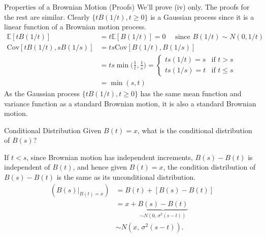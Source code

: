 \documentclass[letterpaper]{beamer}
\def\E{\mathbb E}
\def\CV{\mathrm{Cov}}
\begin{document}
\begin{frame}{Properties of a Brownian Motion (Proofs)}
We'll prove (iv) only. The proofs for the rest are similar.
Clearly $\{tB(1/t), t \ge 0\}$ is a Gaussian process since it is a linear function of a Brownian motion process.
\begin{align*}
\E[tB(1/t)]&=t\E[B(1/t)]=0\quad\text{ since }B(1/t)\sim N(0, 1/t)\\
\CV[tB(1/t),sB(1/s)]&=ts\CV[B(1/t),B(1/s)]\\
&=ts\min\Big(\frac{1}{t},\frac{1}{s}\Big)=\begin{cases}
ts(1/t)=s&\text{if }t>s\\
ts(1/s)=t&\text{if }t\le s
\end{cases}\\
&=\min(s,t)
\end{align*}
As the Gaussian process $\{tB(1/t), t \ge 0\}$ has the same mean function and variance function as a standard Brownian motion, it is also a standard Brownian motion.
\end{frame}
\begin{frame}{Conditional Distribution}
Given $B(t)=x$, what is the conditional distribution of $B(s)$?\bigskip

If $t<s$, since Brownian motion has independent increments,
$B(s)-B(t)$ is independent of $B(t)$, and hence
given $B(t)=x$, the condition distribution of $B(s)-B(t)$ is the same as its unconditional distribution.
\begin{align*}
(B(s)|_{B(t)=x})&=B(t)+[B(s)-B(t)]\\
&=x+\underbrace{B(s)-B(t)}_{\sim N(0,\,\sigma^2(s-t))}\\
&\sim N(x,\,\sigma^2(s-t)).
\end{align*}
\end{frame}
\end{document}

